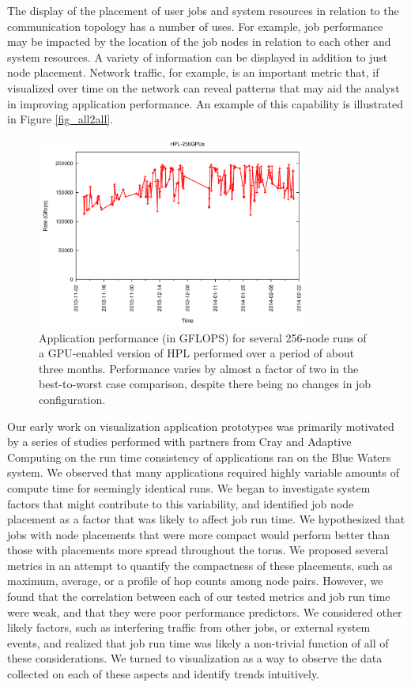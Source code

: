\documentclass[
    10pt,
    conference,
    compsocconf
]{IEEEtran}
\begin{document}
    The display of the placement of user jobs and system resources in relation
    to the communication topology has a number of uses. For example, job
    performance may be impacted by the location of the job nodes in relation to
    each other and system resources. A variety of information can be displayed
    in addition to just node placement. Network traffic, for example, is an
    important metric that, if visualized over time on the network can reveal
    patterns that may aid the analyst in improving application performance. An
    example of this capability is illustrated in Figure \ref{fig_all2all}.

    \begin{figure}[!t]
        \centering
        \includegraphics[width=3.5in]{celso-hpl-bw}
        \caption{
            Application performance (in GFLOPS) for several 256-node runs of a
            GPU-enabled version of HPL performed over a period of about three
            months.  Performance varies by almost a factor of two in the
            best-to-worst case comparison, despite there being no changes in job
            configuration.
        }
        \label{hpl_plot}
    \end{figure}

    Our early work on visualization application prototypes was primarily
    motivated by a series of studies performed with partners from Cray and
    Adaptive Computing on the run time consistency of applications ran on the
    Blue Waters system.  We observed that many applications required highly
    variable amounts of compute time for seemingly identical runs.  We began to
    investigate system factors that might contribute to this variability, and
    identified job node placement as a factor that was likely to affect job run
    time.  We hypothesized that jobs with node placements that were more compact
    would perform better than those with placements more spread throughout the
    torus.  We proposed several metrics in an attempt to quantify the
    compactness of these placements, such as maximum, average, or a profile of
    hop counts among node pairs.  However, we found that the correlation between
    each of our tested metrics and job run time were weak, and that they were
    poor performance predictors.  We considered other likely factors, such as
    interfering traffic from other jobs, or external system events, and realized
    that job run time was likely a non-trivial function of all of these
    considerations.  We turned to visualization as a way to observe the data
    collected on each of these aspects and identify trends intuitively.
\end{document}
